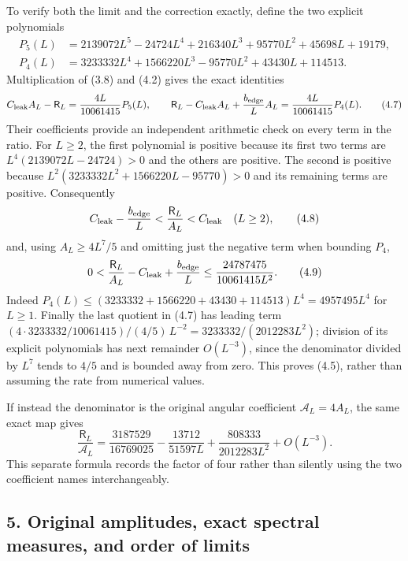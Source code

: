 \documentclass[
  11pt,
]{article}
\begin{document}
To verify both the limit and the correction exactly, define the two
explicit polynomials \[
\begin{split}
 P_5(L)&=2139072L^5-24724L^4+216340L^3
                          +95770L^2+45698L+19179,\\
 P_4(L)&=3233332L^4+1566220L^3-95770L^2
                                      +43430L+114513.
\end{split}
\tag{4.6}
\] Multiplication of (3.8) and (4.2) gives the exact identities \[
 C_{\rm leak}A_L-\mathsf R_L
       =\frac{4L}{10061415}P_5(L),
 \qquad
 \mathsf R_L-C_{\rm leak}A_L+\frac{b_{\rm edge}}L A_L
       =\frac{4L}{10061415}P_4(L).
\tag{4.7}
\] Their coefficients provide an independent arithmetic check on every
term in the ratio. For \(L\ge2\), the first polynomial is positive
because its first two terms are \(L^4(2139072L-24724)>0\) and the others
are positive. The second is positive because
\(L^2(3233332L^2+1566220L-95770)>0\) and its remaining terms are
positive. Consequently \[
 C_{\rm leak}-\frac{b_{\rm edge}}L
   <\frac{\mathsf R_L}{A_L}<C_{\rm leak}
      \quad(L\ge2),
\tag{4.8}
\] and, using \(A_L\ge4L^7/5\) and omitting just the negative term when
bounding \(P_4\), \[
 0<\frac{\mathsf R_L}{A_L}-C_{\rm leak}+\frac{b_{\rm edge}}L
 \le\frac{24787475}{10061415L^2}.
\tag{4.9}
\] Indeed \(P_4(L)\le(3233332+1566220+43430+114513)L^4
=4957495L^4\) for \(L\ge1\). Finally the last quotient in (4.7) has
leading term \((4\cdot3233332/10061415)/(4/5)\,L^{-2}
=3233332/(2012283L^2)\); division of its explicit polynomials has next
remainder \(O(L^{-3})\), since the denominator divided by \(L^7\) tends
to \(4/5\) and is bounded away from zero. This proves (4.5), rather than
assuming the rate from numerical values.

If instead the denominator is the original angular coefficient
\(\mathcal A_L=4A_L\), the same exact map gives \[
 \frac{\mathsf R_L}{\mathcal A_L}
  =\frac{3187529}{16769025}-\frac{13712}{51597L}
        +\frac{808333}{2012283L^2}+O(L^{-3}).
\tag{4.10}
\] This separate formula records the factor of four rather than silently
using the two coefficient names interchangeably.

\subsection{5. Original amplitudes, exact spectral measures, and order
of
limits}\label{magnetic-part-11-original-amplitudes-exact-spectral-measures-and-order-of-limits}
\end{document}
